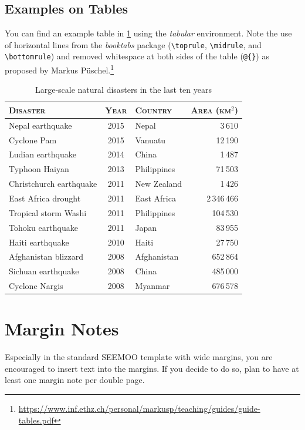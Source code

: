 \subsection{Examples on Tables}

You can find an example table in \cref{tab:disasters} using the \emph{tabular} environment. Note the 
use of horizontal lines from the \emph{booktabs} package (\lstinline|\toprule|, \lstinline|\midrule|, 
and \lstinline|\bottomrule|) and removed whitespace at both sides of the table (\lstinline|@{}|) as 
proposed by Markus Püschel.\footnote{\url{https://www.inf.ethz.ch/personal/markusp/teaching/guides/guide-tables.pdf}}

\begin{table}
\centering
\caption{Large-scale natural disasters in the last ten years}
\label{tab:disasters}
\begin{tabular}{@{} lclr @{}} %
	\toprule
	\textsc{Disaster} & \textsc{Year} & \textsc{Country} & \textsc{Area (\textnormal{km$^2$})} \\
	\midrule
	Nepal earthquake & 2015 & Nepal & 3\,610 \\
	Cyclone Pam & 2015 & Vanuatu & 12\,190 \\
	Ludian earthquake & 2014 & China & 1\,487 \\
	Typhoon Haiyan & 2013 & Philippines & 71\,503 \\
	Christchurch earthquake & 2011 & New Zealand & 1\,426 \\
	East Africa drought & 2011 & East Africa & 2\,346\,466 \\
	Tropical storm Washi & 2011 & Philippines & 104\,530 \\
	Tohoku earthquake & 2011 & Japan & 83\,955 \\
	Haiti earthquake & 2010 & Haiti & 27\,750 \\
	Afghanistan blizzard & 2008 & Afghanistan & 652\,864 \\
	Sichuan earthquake & 2008 & China & 485\,000 \\
	Cyclone Nargis & 2008 & Myanmar & 676\,578 \\
	\bottomrule
\end{tabular}
\end{table}

\section{Margin Notes}

Especially in the standard SEEMOO template with wide margins, you are
 encouraged to insert text into the
margins. If you decide to do so, plan to have at least one margin note
per double page.

